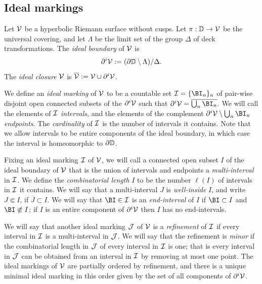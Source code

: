 \documentclass[12pt]{amsart}
\begin{document}
\subsection{Ideal markings}\label{app:ideal markings and waves}

Let $\mathcal V$ be a hyperbolic Riemann surface without cusps. 
Let $\pi: \mathbb D\to \mathcal V$ be the universal covering, and let $\Lambda$ be the limit set of the group $\Delta$ of deck transformations. The \textit{ideal boundary}  of $\mathcal V$ is 
$$\partial^i \mathcal V:= (\partial \mathbb D\setminus \Lambda)/ \Delta.$$ 
The \emph{ideal closure}  $\mathcal V$ is $\overline{\mathcal V}:= \mathcal V\cup \partial^i \mathcal V$.


We define an \textit{ideal marking}  of $\mathcal V$ to be a countable set 
$\II= \{\BI_n\}_n$  of pair-wise disjoint 
open connected subsets of the $\partial^i\mathcal V$ such that $\ddi \VV = \overline {\bigcup_n\BI_n}.$ We will call the elements of $\mathcal I$ \textit{intervals}, and the elements of the complement $\ddi \VV\sm {\bigcup_n {\BI_n}}$ \textit{endpoints}. The \textit{cardinality} of $\mathcal I$ is the number of intervals it contains. 
Note that we allow intervals to be entire components of the ideal boundary, in which case the interval is homeomorphic to $\partial \mathbb D$.

Fixing an ideal marking $\mathcal I$ of $\mathcal V$, 
we will call a connected open subset $I$ of the ideal boundary of $\mathcal V$ that is the union of intervals and endpoints a \emph{multi-interval} in $\mathcal I$.
We define the \textit{combinatorial length} $I$ to be the number $\ell(I)$ of intervals in $\mathcal I$ it contains. 
We will say that a multi-interval $J$ is \emph{well-inside} $I$, and write $J\Subset I$, if $\overline J\subset I$.
We will say that $\BI\in \II$ is an \textit{end-interval} of $I$ if $\BI\subset I$ and  $\BI\not \Subset I$; if $I$ is an entire component of $\partial^i \mathcal V$ then $I$ has no end-intervals.

We will say that another ideal marking $\mathcal J$ of $\mathcal V$ is a \emph{refinement}  of $\mathcal I$ if every interval in $\mathcal I$ is a multi-interval in $\mathcal J$. We will say that the refinement is \emph{minor}  if the combinatorial length in $\mathcal J$ of every interval in $\mathcal I$ is one; that is every interval in $\mathcal J$ can be obtained from an interval in $\mathcal I$ by removing at most one point. 
The ideal markings of $\mathcal V$ are partially ordered by refinement, and there is a unique minimal ideal marking in this order given by the set of all components of $\partial^i \mathcal V$.
\end{document}
